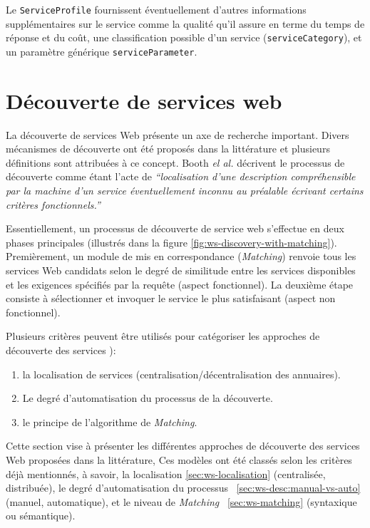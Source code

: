     Le \verb|ServiceProfile| fournissent éventuellement d'autres
    informations supplémentaires sur le service comme la qualité qu'il
    assure en terme du temps de réponse et du coût, une classification
    possible d'un service (\verb|serviceCategory|), et un paramètre
    générique \verb|serviceParameter|.

\newpage
\section{Découverte de services web}
\label{sec:ws-discovery}
La découverte de services Web présente un axe de recherche
important. Divers mécanismes de découverte ont été proposés dans la
littérature et plusieurs définitions sont attribuées à ce
concept. Booth \textit{el al.} \cite{booth2004web} décrivent le
processus de découverte comme étant l'acte de \textit{``localisation
  d'une description compréhensible par la machine d'un service
  éventuellement inconnu au préalable écrivant certains critères
  fonctionnels.''}



Essentiellement, un processus de découverte de service web s'effectue
en deux phases principales (illustrés dans la figure
\ref{fig:ws-discovery-with-matching}). Premièrement, un module de mis
en correspondance (\textit{Matching}) renvoie tous les services Web
candidats selon le degré de similitude entre les services disponibles
et les exigences spécifiés par la requête (aspect fonctionnel). La
deuxième étape consiste à sélectionner et invoquer le service le plus
satisfaisant (aspect non fonctionnel).

Plusieurs critères peuvent être utilisés pour catégoriser les
approches de découverte des services \cite{ mohebbi2010comparative,
  elie2010, bitar2014cbr4wsd}):
\enddescription
  \begin{enumerate}
  \item la localisation de services (centralisation/décentralisation
    des annuaires).
  \item Le degré d'automatisation du processus de la découverte.
  \item le principe de l'algorithme de \textit{Matching}.
\end{enumerate}

Cette section vise à présenter les différentes approches de découverte
des services Web proposées dans la littérature, Ces modèles ont été
classés selon les critères déjà mentionnés, à savoir, la localisation
\ref{sec:ws-localisation} (centralisée, distribuée), le degré
d'automatisation du processus ~\ref{sec:ws-desc:manual-vs-auto}
(manuel, automatique), et le niveau de \textit{Matching}
~\ref{sec:ws-matching} (syntaxique ou sémantique).

